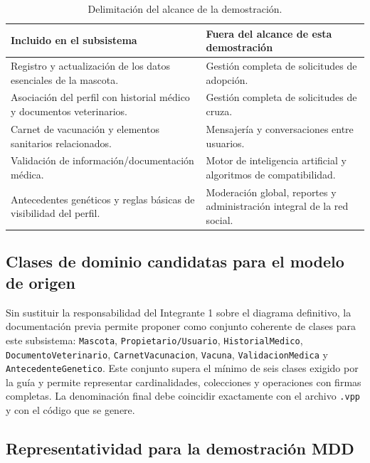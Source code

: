 \documentclass[journal,onecolumn]{IEEEtran}
\begin{document}
	\begin{table}[H]
		\caption{Delimitación del alcance de la demostración.}
		\label{tab:alcance}
		\centering
		\begin{tabularx}{\linewidth}{|X|X|}
			\hline
			\textbf{Incluido en el subsistema} & \textbf{Fuera del alcance de esta demostración} \\
			\hline
			Registro y actualización de los datos esenciales de la mascota. & Gestión completa de solicitudes de adopción. \\
			\hline
			Asociación del perfil con historial médico y documentos veterinarios. & Gestión completa de solicitudes de cruza. \\
			\hline
			Carnet de vacunación y elementos sanitarios relacionados. & Mensajería y conversaciones entre usuarios. \\
			\hline
			Validación de información/documentación médica. & Motor de inteligencia artificial y algoritmos de compatibilidad. \\
			\hline
			Antecedentes genéticos y reglas básicas de visibilidad del perfil. & Moderación global, reportes y administración integral de la red social. \\
			\hline
		\end{tabularx}
	\end{table}
	
	\subsection{Clases de dominio candidatas para el modelo de origen}
	
	Sin sustituir la responsabilidad del Integrante 1 sobre el diagrama definitivo, la documentación previa permite proponer como conjunto coherente de clases para este subsistema: \texttt{Mascota}, \texttt{Propietario/Usuario}, \texttt{HistorialMedico}, \texttt{DocumentoVeterinario}, \texttt{CarnetVacunacion}, \texttt{Vacuna}, \texttt{ValidacionMedica} y \texttt{AntecedenteGenetico}. Este conjunto supera el mínimo de seis clases exigido por la guía y permite representar cardinalidades, colecciones y operaciones con firmas completas. La denominación final debe coincidir exactamente con el archivo \texttt{.vpp} y con el código que se genere.
	
	\subsection{Representatividad para la demostración MDD}
	
\end{document}
